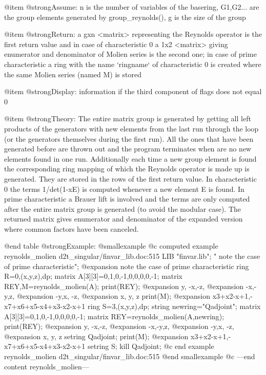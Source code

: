 @item @strong{Assume:}
n is the number of variables of the basering, G1,G2... are the group
elements generated by group_reynolds(), g is the size of the group

@item @strong{Return:}
a gxn <matrix> representing the Reynolds operator is the first return
value and in case of characteristic 0 a 1x2 <matrix> giving enumerator
and denominator of Molien series is the second one; in case of prime
characteristic a ring with the name `ringname` of characteristic 0 is
created where the same Molien series (named M) is stored

@item @strong{Display:}
information if the third component of flags does not equal 0

@item @strong{Theory:}
The entire matrix group is generated by getting all left products of
the generators with new elements from the last run through the loop
(or the generators themselves during the first run). All the ones that
have been generated before are thrown out and the program terminates
when are no new elements found in one run. Additionally each time a
new group element is found the corresponding ring mapping of which the
Reynolds operator is made up is generated. They are stored in the rows
of the first return value. In characteristic 0 the terms 1/det(1-xE)
is computed whenever a new element E is found. In prime characteristic
a Brauer lift is involved and the terms are only computed after the
entire matrix group is generated (to avoid the modular case). The
returned matrix gives enumerator and denominator of the expanded
version where common factors have been canceled.

@end table
@strong{Example:}
@smallexample
@c computed example reynolds_molien d2t_singular/finvar_lib.doc:515 
LIB "finvar.lib";
"         note the case of prime characteristic"; 
@expansion{}          note the case of prime characteristic
ring R=0,(x,y,z),dp;
matrix A[3][3]=0,1,0,-1,0,0,0,0,-1;
matrix REY,M=reynolds_molien(A);
print(REY);
@expansion{} y, -x,-z,
@expansion{} -x,-y,z, 
@expansion{} -y,x, -z,
@expansion{} x, y, z  
print(M);
@expansion{} x3+x2-x+1,-x7+x6+x5-x4+x3-x2-x+1
ring S=3,(x,y,z),dp;
string newring="Qadjoint";
matrix A[3][3]=0,1,0,-1,0,0,0,0,-1;
matrix REY=reynolds_molien(A,newring);
print(REY);
@expansion{} y, -x,-z,
@expansion{} -x,-y,z, 
@expansion{} -y,x, -z,
@expansion{} x, y, z  
setring Qadjoint;
print(M);
@expansion{} x3+x2-x+1,-x7+x6+x5-x4+x3-x2-x+1
setring S;
kill Qadjoint;
@c end example reynolds_molien d2t_singular/finvar_lib.doc:515
@end smallexample
@c ---end content reynolds_molien---


